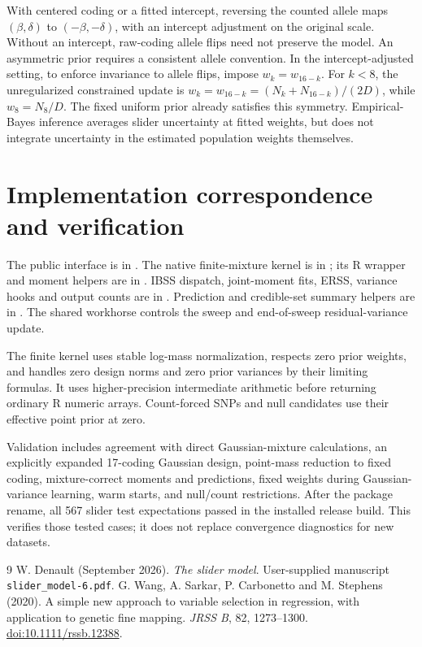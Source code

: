 \documentclass[11pt]{article}
\begin{document}
With centered coding or a fitted intercept, reversing the counted allele
maps $(\beta,\delta)$ to $(-\beta,-\delta)$, with an intercept adjustment
on the original scale. Without an intercept, raw-coding allele flips need
not preserve the model. An asymmetric prior requires a consistent allele
convention. In the intercept-adjusted setting, to enforce invariance to allele flips,
impose $w_k=w_{16-k}$. For $k<8$, the unregularized constrained update is
$w_k=w_{16-k}=(N_k+N_{16-k})/(2D)$, while $w_8=N_8/D$.
The fixed uniform prior already satisfies this symmetry. Empirical-Bayes
inference averages slider uncertainty at fitted weights, but does not
integrate uncertainty in the estimated population weights themselves.

\section{Implementation correspondence and verification}
The public interface is in . The native finite-mixture
kernel is in ; its R wrapper and moment helpers
are in . IBSS dispatch, joint-moment fits, ERSS,
variance hooks and output counts are in .
Prediction and credible-set summary helpers are in
. The shared workhorse controls the sweep and
end-of-sweep residual-variance update.

The finite kernel uses stable log-mass normalization, respects zero
prior weights, and handles zero design norms and zero prior variances
by their limiting formulas. It uses higher-precision intermediate
arithmetic before returning ordinary R numeric arrays. Count-forced
SNPs and null candidates use their effective point prior at zero.

Validation includes agreement with direct Gaussian-mixture calculations,
an explicitly expanded 17-coding Gaussian design, point-mass reduction
to fixed coding, mixture-correct moments and predictions, fixed weights
during Gaussian-variance learning, warm starts, and null/count restrictions.
After the package rename, all 567 slider test expectations passed in the
installed release build. This verifies those tested cases; it does not
replace convergence diagnostics for new datasets.

\begin{thebibliography}{9}
 W. Denault (September 2026).
\emph{The slider model}. User-supplied manuscript
\texttt{slider\_model-6.pdf}.
 G. Wang, A. Sarkar, P. Carbonetto and M. Stephens (2020).
A simple new approach to variable selection in regression, with
application to genetic fine mapping. \emph{JRSS B}, 82, 1273--1300.
\href{https://doi.org/10.1111/rssb.12388}{doi:10.1111/rssb.12388}.
\end{thebibliography}
\end{document}
